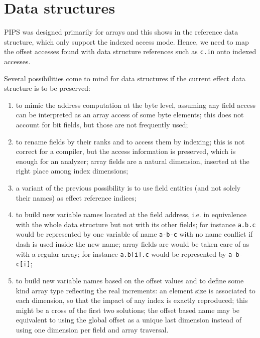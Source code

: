 \documentclass[a4paper]{report}
\begin{document}
\section{Data structures}
\label{section:data-structures}

PIPS was designed primarily for arrays and this shows in the reference
 data structure, which only support the indexed access mode. Hence, we
 need to map the offset accesses found with data structure references
 such as \verb/c.in/ onto indexed accesses.

Several possibilities come to mind for data structures if the current
 effect data structure is to be preserved:
\begin{enumerate}

\item to mimic the address computation at the byte level, assuming any
 field access can be interpreted as an array access of some byte
 elements; this does not account for bit fields, but those are not frequently used;

\item to rename fields by their ranks and to access them by indexing;
 this is not correct for a compiler, but the access information is
 preserved, which is enough for an analyzer; array fields are a
 natural dimension, inserted at the right place among index
 dimensions;

\item a variant of the previous possibility is to use field entities
  (and not solely their names) as effect reference indices;

\item to build new variable names located at the field address,
 i.e. in equivalence with the whole data structure but not with its
 other fields; for instance \verb/a.b.c/ would be represented by one
 variable of name \verb/a-b-c/ with no name conflict if dash is used
 inside the new name; array fields are would be taken care of as with
 a regular array; for instance \verb/a.b[i].c/ would be represented by
 \verb/a-b-c[i]/;

\item to build new variable names based on the offset values and to
 define some kind array type reflecting the real increments: an
 element size is associated to each dimension, so that the impact of
 any index is exactly reproduced; this might be a cross of the first
 two solutions; the offset based name may be equivalent to using the
 global offset as a unique last dimension instead of using one
 dimension per field and array traversal.

\end{enumerate}
\end{document}
